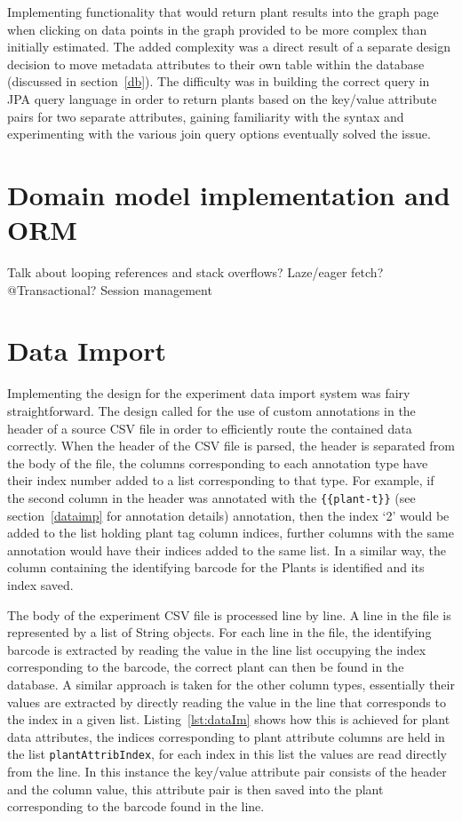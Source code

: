 Implementing functionality that would return plant results into the graph page when clicking on data points in the graph provided to be more complex than initially estimated. The added complexity was a direct result of a separate design decision to move metadata attributes to their own table within the database (discussed in section~\ref{db}). The difficulty was in building the correct query in JPA query language in order to return plants based on the key/value attribute pairs for two separate attributes, gaining familiarity with the syntax and experimenting with the various join query options eventually solved the issue.

\section{Domain model implementation and ORM}
Talk about looping references and stack overflows? Laze/eager fetch? @Transactional?  Session management

\section{Data Import}
Implementing the design for the experiment data import system was fairy straightforward. The design called for the use of custom annotations in the header of a source CSV file in order to efficiently route the contained data correctly. When the header of the CSV file is parsed, the header is separated from the body of the file, the columns corresponding to each annotation type have their index number added to a list corresponding to that type. For example, if the second column in the header was annotated with the \texttt{\{\{plant-t\}\}} (see section~\ref{dataimp} for annotation details) annotation, then the index `2' would be added to the list holding plant tag column indices, further columns with the same annotation would have their indices added to the same list. In a similar way, the column containing the identifying barcode for the Plants is identified and its index saved. 

The body of the experiment CSV file is processed line by line. A line in the file is represented by a list of String objects. For each line in the file, the identifying barcode is extracted by reading the value in the line list occupying the index corresponding to the barcode, the correct plant can then be found in the database. A similar approach is taken for the other column types, essentially their values are extracted by directly reading the value in the line that corresponds to the index in a given list. Listing~\ref{lst:dataIm} shows how this is achieved for plant data attributes, the indices corresponding to plant attribute columns are held in the list \texttt{plantAttribIndex}, for each index in this list the values are read directly from the line. In this instance the key/value attribute pair consists of the header and the column value, this attribute pair is then saved into the plant corresponding to the barcode found in the line.

